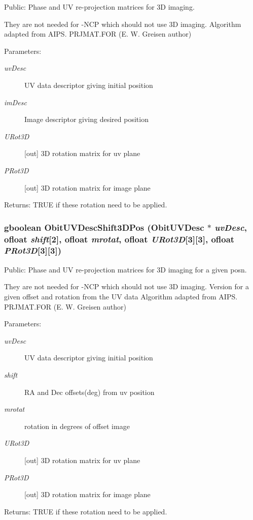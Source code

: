 Public: Phase and UV re-projection matrices for 3D imaging. 

They are not needed for -NCP which should not use 3D imaging. Algorithm adapted from AIPS. PRJMAT.FOR (E. W. Greisen author) \begin{Desc}
\item[Parameters:]
\begin{description}
\item[{\em uv\-Desc}]UV data descriptor giving initial position \item[{\em im\-Desc}]Image descriptor giving desired position \item[{\em URot3D}][out] 3D rotation matrix for uv plane \item[{\em PRot3D}][out] 3D rotation matrix for image plane \end{description}
\end{Desc}
\begin{Desc}
\item[Returns:]TRUE if these rotation need to be applied. \end{Desc}
\subsubsection{\setlength{\rightskip}{0pt plus 5cm}gboolean Obit\-UVDesc\-Shift3DPos ({\bf Obit\-UVDesc} $\ast$ {\em uv\-Desc}, {\bf ofloat} {\em shift}[2], {\bf ofloat} {\em mrotat}, {\bf ofloat} {\em URot3D}[3][3], {\bf ofloat} {\em PRot3D}[3][3])}\label{ObitUVDesc_8c_a23}


Public: Phase and UV re-projection matrices for 3D imaging for a given posn. 

They are not needed for -NCP which should not use 3D imaging. Version for a given offset and rotation from the UV data Algorithm adapted from AIPS. PRJMAT.FOR (E. W. Greisen author) \begin{Desc}
\item[Parameters:]
\begin{description}
\item[{\em uv\-Desc}]UV data descriptor giving initial position \item[{\em shift}]RA and Dec offsets(deg) from uv position \item[{\em mrotat}]rotation in degrees of offset image \item[{\em URot3D}][out] 3D rotation matrix for uv plane \item[{\em PRot3D}][out] 3D rotation matrix for image plane \end{description}
\end{Desc}
\begin{Desc}
\item[Returns:]TRUE if these rotation need to be applied. \end{Desc}

